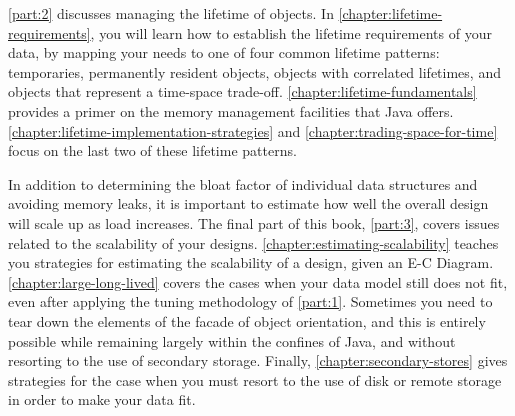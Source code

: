 
\autoref{part:2} discusses managing the lifetime of objects. In
\autoref{chapter:lifetime-requirements}, you will learn how to establish the
lifetime requirements of your data, by mapping your needs to one of four common
lifetime patterns: temporaries, permanently resident objects, objects with
correlated lifetimes, and objects that represent a time-space trade-off.
\autoref{chapter:lifetime-fundamentals} provides a primer on the memory
management facilities that Java offers.
\autoref{chapter:lifetime-implementation-strategies} and
\autoref{chapter:trading-space-for-time} focus on the last two of these lifetime
patterns.


In addition to determining the bloat factor of individual data structures and
avoiding memory leaks, it is important to estimate how well the overall design
will scale up as load increases. The final part of this book, \autoref{part:3},
covers issues related to the scalability of your designs.
\autoref{chapter:estimating-scalability} teaches you strategies for estimating
the scalability of a design, given an E-C Diagram.
\autoref{chapter:large-long-lived} covers the cases when your data model still
does not fit, even after applying the tuning methodology of \autoref{part:1}.
Sometimes you need to tear down the elements of the facade of object
orientation, and this is entirely possible while remaining largely within the
confines of Java, and without resorting to the use of secondary storage.
Finally, \autoref{chapter:secondary-stores} gives strategies for the case when
you must resort to the use of disk or remote storage in order to make your data
fit.




\begin{comment}
\section{Conventions Used in This Book}

[NOTE(GSS): add data structure to the list.  possibly add relationship as well.]

Terms like object can have different meanings in the literature.  The following are the conventions used throughout this book.

\begin{itemize}
\item A \textit{class} is a Java class. A class name, for example \texttt{String}, always appears in type-writer font. 
\item A \textit{data model} is a set of classes that represents one or more logical concepts.
\item Finally, an \textit{object} is an instance of a class, that exists at runtime occupying a contiguous section of memory.
\end{itemize} 
\end{comment}





